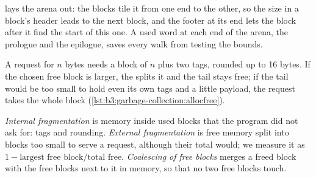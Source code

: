 lays the arena out: the blocks tile it from one end to the other, so the size in a block's header leads to the next block, and the footer at its end lets the block after it find the start of this one. A used word at each end of the arena, the prologue and the epilogue, saves every walk from testing the bounds.

\label{lst:b3:garbage-collection:tags}

\label{lst:b3:garbage-collection:fits}

A request for $n$ bytes needs a block of $n$ plus two tags, rounded up to 16 bytes. If the chosen free block is larger, the  splits it and the tail stays free; if the tail would be too small to hold even its own tags and a little payload, the request takes the whole block (\cref{lst:b3:garbage-collection:allocfree}).

\begin{definition}\label{def:b3:garbage-collection:fragmentation}
\emph{Internal fragmentation} is memory inside used blocks that the program did not ask for: tags and rounding. \emph{External fragmentation} is free memory split into blocks too small to serve a request, although their total would; we measure it as $1 - \text{largest free block}/\text{total free}$. \emph{Coalescing of free blocks} merges a freed block with the free blocks next to it in memory, so that no two free blocks touch.
\end{definition}

\label{lst:b3:garbage-collection:allocfree}

